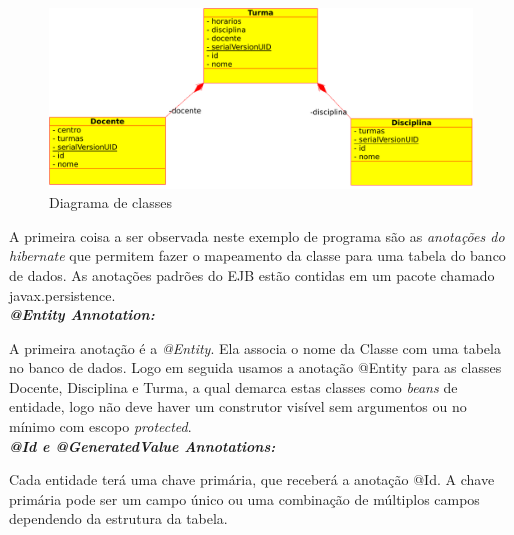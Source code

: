 \documentclass[12pt,a4paper]{article}
\begin{document}
\begin{figure}[H]
    \centering
    \includegraphics[scale=0.50]{DiagramaClasses.pdf}
    \caption{Diagrama de classes}
    \label{imagemDiagramaClasses}
\end{figure}

 A primeira coisa a ser observada neste exemplo de programa são as \textit{anotações do hibernate} que permitem fazer o mapeamento da classe para uma tabela do banco de dados. As anotações padrões do EJB estão contidas em um pacote chamado javax.persistence.\\

\textit{\textbf{@Entity Annotation:}}

A primeira anotação é a \textit{@Entity}. Ela associa o nome da Classe com uma tabela no banco de dados. Logo em seguida usamos a anotação @Entity para as classes Docente, Disciplina e Turma, a qual demarca estas classes como \textit{beans} de entidade, logo não deve haver um construtor visível sem argumentos ou no mínimo com escopo \textit{protected}. \\

\textit{\textbf{@Id e @GeneratedValue Annotations:}}

Cada entidade terá uma chave primária, que receberá a anotação @Id. A chave primária pode ser um campo único ou uma combinação de múltiplos campos dependendo da estrutura da tabela.


\end{document}
